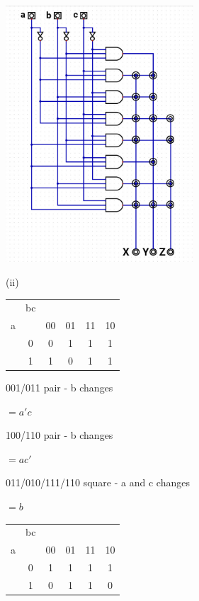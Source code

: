 \documentclass{article}
\begin{document}
    \begin{center}
        \includegraphics[width=70mm]{HW3_q9.jpg}
    \end{center}

    \quad\quad (ii)

    \begin{center}
        \begin{tabular} {cc|cccc}
            & bc & &&& \\
            a && 00 & 01 & 11 & 10 \\
            \hline
            & 0 & 0 & 1 & 1 & 1 \\
            & 1 & 1 & 0 & 1 & 1 \\
        \end{tabular}
    \end{center}

    001/011 pair - b changes

    \quad\quad $=a'c$

    100/110 pair - b changes 

    \quad\quad $=ac'$

    011/010/111/110 square - a and c changes

    \quad\quad $=b$


    \begin{center}
        \begin{tabular} {cc|cccc}
            & bc & &&& \\
            a && 00 & 01 & 11 & 10 \\
            \hline
            & 0 & 1 & 1 & 1 & 1 \\
            & 1 & 0 & 1 & 1 & 0 \\
        \end{tabular}
    \end{center}
\end{document}
